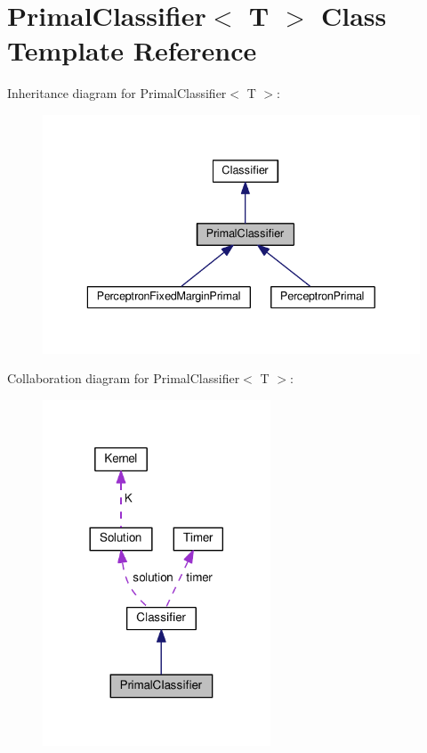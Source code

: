 \hypertarget{class_primal_classifier}{}\section{Primal\+Classifier$<$ T $>$ Class Template Reference}
\label{class_primal_classifier}


Inheritance diagram for Primal\+Classifier$<$ T $>$\+:\nopagebreak
\begin{figure}[H]
\begin{center}
\leavevmode
\includegraphics[width=336pt]{class_primal_classifier__inherit__graph}
\end{center}
\end{figure}


Collaboration diagram for Primal\+Classifier$<$ T $>$\+:\nopagebreak
\begin{figure}[H]
\begin{center}
\leavevmode
\includegraphics[width=192pt]{class_primal_classifier__coll__graph}
\end{center}
\end{figure}

